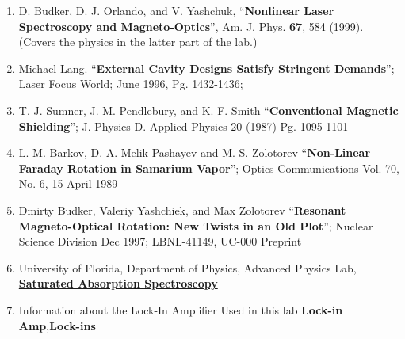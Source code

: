 \documentclass{../lab}
\begin{document}
\begin{enumerate}
    \item D. Budker, D. J. Orlando, and V. Yashchuk, ``\textbf{Nonlinear Laser Spectroscopy and Magneto-Optics}'', Am. J. Phys. \textbf{67}, 584 (1999). (Covers the physics in the latter part of the lab.)

    \item Michael Lang. ``\textbf{External Cavity Designs Satisfy Stringent Demands}''; Laser Focus World; June 1996, Pg. 1432-1436;

    \item T. J. Sumner, J. M. Pendlebury, and K. F. Smith ``\textbf{Conventional Magnetic Shielding}''; J. Physics D. Applied Physics 20 (1987) Pg. 1095-1101

    \item L. M. Barkov, D. A. Melik-Pashayev and M. S. Zolotorev ``\textbf{Non-Linear Faraday Rotation in Samarium Vapor}''; Optics Communications Vol. 70, No. 6, 15 April 1989

    \item Dmirty Budker, Valeriy Yashchiek, and Max Zolotorev ``\textbf{Resonant Magneto-Optical Rotation: New Twists in an Old Plot}''; Nuclear Science Division Dec 1997; LBNL-41149, UC-000 Preprint

    \item University of Florida, Department of Physics, Advanced Physics Lab, \href{https://berkeley-physics111b.github.io/assets/pdf/oldwebsitestructure/SaturatedAbsorptionSpectroscopy.pdf}{\textbf{Saturated Absorption Spectroscopy}}

    \item Information about the Lock-In Amplifier Used in this lab \textbf{Lock-in Amp},\textbf{Lock-ins}

\end{enumerate}
\end{document}
